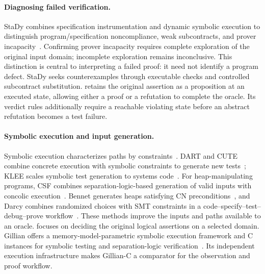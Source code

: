 \paragraph{Diagnosing failed verification.}
StaDy combines specification instrumentation and dynamic symbolic execution
to distinguish program/specification noncompliance, weak subcontracts, and
prover incapacity~\cite{petiot2018stady}. Confirming prover incapacity
requires complete exploration of the original input domain; incomplete
exploration remains inconclusive. This distinction is central to
interpreting a failed proof: it need not identify a program defect.
StaDy seeks counterexamples through executable checks and controlled
subcontract substitution. \tespec{} retains the original assertion as a
proposition at an executed state, allowing either a proof or a refutation
to complete the oracle. Its verdict rules additionally require a reachable
violating state before an abstract refutation becomes a test failure.

\paragraph{Symbolic execution and input generation.}
Symbolic execution characterizes paths by constraints~\cite{king1976symbolic}.
DART and CUTE combine concrete execution with symbolic constraints to
generate new tests~\cite{godefroid2005dart,sen2005cute}; KLEE scales symbolic
test generation to systems code~\cite{cadar2008klee}.
For heap-manipulating programs, CSF combines separation-logic-based
generation of valid inputs with concolic
execution~\cite{pham2019csf}. Bennet generates heaps satisfying CN
preconditions~\cite{aamer2025bennet}, and Darcy combines randomized choices
with SMT constraints in a code--specify--test--debug--prove
workflow~\cite{aamer2026workflow}. These methods improve the inputs and paths
available to an oracle. \tespec{} focuses on deciding the original logical
assertions on a selected domain.
Gillian offers a memory-model-parametric symbolic execution framework and
C instances for symbolic testing and separation-logic
verification~\cite{santos2020gillian,maksimovic2021gillian}. Its independent
execution infrastructure makes Gillian-C a comparator for the observation
and proof workflow.

